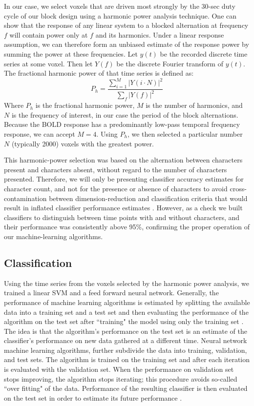 \documentclass[preprint,5p,authoryear]{elsarticle}
\begin{document}
In our case, we select voxels that are driven most strongly by the 30-sec duty cycle of our block design
using a harmonic power analysis technique. 
One can show that the response of any linear system to a blocked alternation at frequency $f$ will contain power only at $f$ and its harmonics. 
Under a linear response assumption, we can therefore form an unbiased estimate of the response power by summing the power at these frequencies. 
Let $y(t)$ be the recorded discrete time series at some voxel.
Then let $Y(f)$ be the discrete Fourier transform of $y(t)$.
The fractional harmonic power of that time series is defined as:
\begin{equation}
P_h = \frac{\sum_{i = 1}^{M}{\left|Y(i \cdot N)\right|^{2}}}{\sum_{f}{\left|Y(f)\right|^{2}}}
\end{equation}
Where $P_h$ is the fractional harmonic power, $M$ is the number of harmonics, and $N$ is the frequency of interest, in our case the period of the block alternations. 
Because the BOLD response has a predominantly low-pass temporal frequency response, we can accept $M = 4$. 
Using $P_h$, we then selected a particular number $N$ (typically 2000) voxels with the greatest power. 

This harmonic-power selection was based on the alternation between characters present and characters absent, without regard to the number of characters presented. 
Therefore, we will only be presenting classifier accuracy estimates for character count, and not for the presence or absence of characters to avoid cross-contamination between dimension-reduction and  classification criteria that would result in inflated classifier performance estimates \citep{CrossContamination}.
However, as a check we built classifiers to distinguish between time points with and without characters, and their performance was consistently above 95\%, confirming the proper operation of our machine-learning algorithms.

\subsection{Classification}
Using the time series from the voxels selected by the harmonic power analysis, we trained a linear SVM and a feed forward neural network.
Generally, the performance of machine learning algorithms is estimated by splitting the available data into a training set and a test set and then evaluating the performance of the algorithm on the test set after ``training" the model using only the training set \citep{needRef1}.
The idea is that the algorithm's performance on the test set is an estimate of the classifier's performance on new data gathered at a different time.
Neural network machine learning algorithms, further subdivide the data into training, validation, and test sets.
The algorithm is trained on the training set and after each iteration is evaluated with the validation set.
When the performance on validation set stops improving, the algorithm stops iterating; this procedure avoids so-called ``over fitting" of the data.
Performance of the resulting classifier is then evaluated on the test set in order to estimate its future performance \citep{needRef2}.
\end{document}
